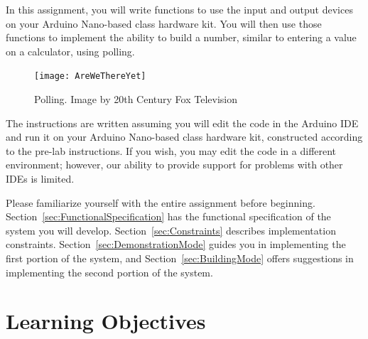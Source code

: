 

\usepackage{enumitem}
\usepackage{graphicx}
\usepackage{addfont}
\usepackage{subfig}
\usepackage{multicol}




\renewcommand{\labnumber}{8}
\renewcommand{\labname}{Using Polling with Memory-Mapped Input/Output}
\renewcommand{\shortlabname}{memory-mapped i/o -- pollinglab}
\renewcommand{\collaborationrules}{\individualeffort}
\renewcommand{\duedate}{Week of April 11, Before the start of your lab section}
\newcommand{\nano}{Arduino Nano}
\renewcommand{\runtimeenvironment}{your \nano-based class hardware kit}

\startdocument

In this assignment, you will write functions to use the input and output
devices on \runtimeenvironment. You will then use those functions to implement
the ability to build a number, similar to entering a value on a calculator,
using polling.

\begin{figure}[h]
    \centering
    \texttt{[image: AreWeThereYet]}
    \caption{Polling. \tiny Image by 20th Century Fox Television}
\end{figure}

The instructions are written assuming you will edit the code in the Arduino IDE
and run it on \runtimeenvironment, constructed according to the pre-lab
instructions. If you wish, you may edit the code in a different environment;
however, our ability to provide support for problems with other IDEs is limited.

Please familiarize yourself with the entire assignment before beginning.
Section~\ref{sec:FunctionalSpecification} has the functional specification of
the system you will develop. Section~\ref{sec:Constraints} describes
implementation constraints. Section~\ref{sec:DemonstrationMode} guides you in
implementing the first portion of the system, and
Section~\ref{sec:BuildingMode} offers suggestions in implementing the second
portion of the system.

\section*{Learning Objectives}

